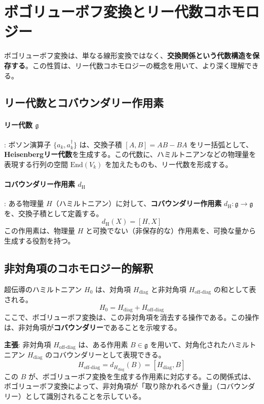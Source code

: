 \documentclass[uplatex,a4j,12pt,dvipdfmx]{jsarticle}
\begin{document}
\section{ボゴリューボフ変換とリー代数コホモロジー}

ボゴリューボフ変換は、単なる線形変換ではなく、\textbf{交換関係という代数構造を保存する}。この性質は、リー代数コホモロジーの概念を用いて、より深く理解できる。

\subsection{リー代数とコバウンダリー作用素}

\paragraph{リー代数 $\mathfrak{g}$}:
ボソン演算子 $\{a_{k}, a_{k}^{\dagger}\}$ は、交換子積 $[A, B] = AB-BA$ をリー括弧として、\textbf{Heisenbergリー代数}を生成する。この代数に、ハミルトニアンなどの物理量を表現する行列の空間 $\mathrm{End}(V_{k})$ を加えたものも、リー代数を形成する。

\paragraph{コバウンダリー作用素 $d_{\text{H}}$}:
ある物理量 $H$（ハミルトニアン）に対して、\textbf{コバウンダリー作用素} $d_{\text{H}}: \mathfrak{g} \to \mathfrak{g}$ を、交換子積として定義する。
\[
	d_{\text{H}}(X) = [H, X]
\]
この作用素は、物理量 $H$ と可換でない（非保存的な）作用素を、可換な量から生成する役割を持つ。

\subsection{非対角項のコホモロジー的解釈}

超伝導のハミルトニアン $H_{\text{0}}$ は、対角項 $H_{\text{diag}}$ と非対角項 $H_{\text{off-diag}}$ の和として表される。
\[
	H_{\text{0}} = H_{\text{diag}} + H_{\text{off-diag}}
\]
ここで、ボゴリューボフ変換は、この非対角項を消去する操作である。この操作は、非対角項が\textbf{コバウンダリー}であることを示唆する。

\textbf{主張}: 非対角項 $H_{\text{off-diag}}$ は、ある作用素 $B \in \mathfrak{g}$ を用いて、対角化されたハミルトニアン $H_{\text{diag}}$ のコバウンダリーとして表現できる。
\[
	H_{\text{off-diag}} = d_{H_{\text{diag}}}(B) = [H_{\text{diag}}, B]
\]
この $B$ が、ボゴリューボフ変換を生成する作用素に対応する。この関係式は、ボゴリューボフ変換によって、非対角項が「取り除かれるべき量」（コバウンダリー）として識別されることを示している。
\end{document}
